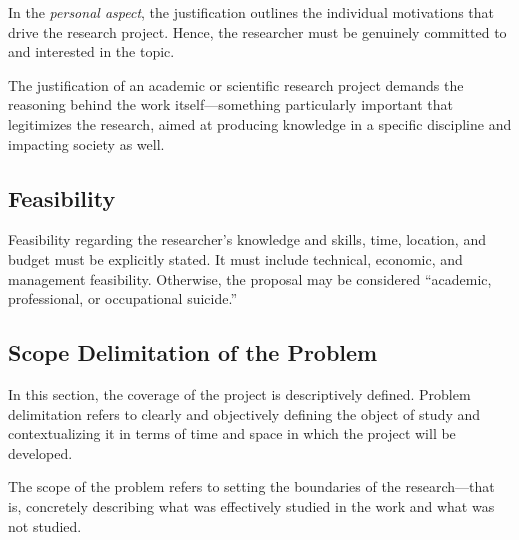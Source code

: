 In the \textit{personal aspect}, the justification outlines the individual motivations that drive the research project. Hence, the researcher must be genuinely committed to and interested in the topic.

The justification of an academic or scientific research project demands the reasoning behind the work itself—something particularly important that legitimizes the research, aimed at producing knowledge in a specific discipline and impacting society as well.

\subsection{Feasibility}

Feasibility regarding the researcher's knowledge and skills, time, location, and budget must be explicitly stated. It must include technical, economic, and management feasibility. Otherwise, the proposal may be considered “academic, professional, or occupational suicide.”

\subsection{Scope Delimitation of the Problem}

In this section, the coverage of the project is descriptively defined. Problem delimitation refers to clearly and objectively defining the object of study and contextualizing it in terms of time and space in which the project will be developed.

The scope of the problem refers to setting the boundaries of the research—that is, concretely describing what was effectively studied in the work and what was not studied.
